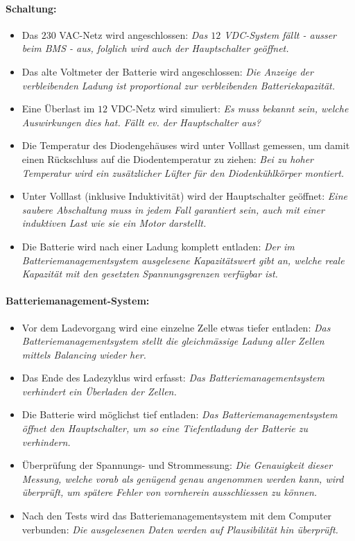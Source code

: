 \paragraph{Schaltung:} \begin{itemize}
	\item Das $230$ VAC-Netz wird angeschlossen: \textit{Das $12$ VDC-System fällt - ausser beim BMS - aus, folglich wird auch der Hauptschalter geöffnet.}
	\item Das alte Voltmeter der Batterie wird angeschlossen: \textit{Die Anzeige der verbleibenden Ladung ist proportional zur verbleibenden Batteriekapazität.}
	\item Eine Überlast im $12$ VDC-Netz wird simuliert: \textit{Es muss bekannt sein, welche Auswirkungen dies hat. Fällt ev. der Hauptschalter aus?}
	\item Die Temperatur des Diodengehäuses wird unter Volllast gemessen, um damit einen Rückschluss auf die Diodentemperatur zu ziehen: \textit{Bei zu hoher Temperatur wird ein zusätzlicher Lüfter für den Diodenkühlkörper montiert. }
	\item Unter Volllast (inklusive Induktivität) wird der Hauptschalter geöffnet: \textit{Eine saubere Abschaltung muss in jedem Fall garantiert sein, auch mit einer induktiven Last wie sie ein Motor darstellt.}
	\item Die Batterie wird nach einer Ladung komplett entladen: \textit{Der im Batteriemanagementsystem ausgelesene Kapazitätswert gibt an, welche reale Kapazität mit den gesetzten Spannungsgrenzen verfügbar ist.}
\end{itemize}

\paragraph{Batteriemanagement-System:} \begin{itemize}
	\item Vor dem Ladevorgang wird eine einzelne Zelle etwas tiefer entladen: \textit{Das Batteriemanagementsystem stellt die gleichmässige Ladung aller Zellen mittels Balancing wieder her.}
	\item Das Ende des Ladezyklus wird erfasst: \textit{Das Batteriemanagementsystem verhindert ein Überladen der Zellen.}
	\item Die Batterie wird möglichst tief entladen: \textit{Das Batteriemanagementsystem öffnet den Hauptschalter, um so eine Tiefentladung der Batterie zu verhindern.}
	\item Überprüfung der Spannungs- und Strommessung: \textit{Die Genauigkeit dieser Messung, welche vorab als genügend genau angenommen werden kann, wird überprüft, um spätere Fehler von vornherein ausschliessen zu können.}
	\item Nach den Tests wird das Batteriemanagementsystem mit dem Computer verbunden: \textit{Die ausgelesenen Daten werden auf Plausibilität hin überprüft.}
\end{itemize}\color{black}


\newpage